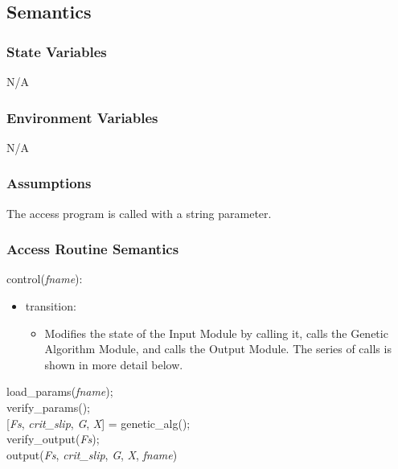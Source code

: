 \documentclass[12pt, titlepage]{article}
\begin{document}
\subsection{Semantics}

\subsubsection{State Variables}

N/A

\subsubsection{Environment Variables}

N/A

\subsubsection{Assumptions}

The access program is called with a string parameter.

\subsubsection{Access Routine Semantics}

control(\textit{fname}):
\begin{itemize}
	\item transition: 
	\begin{itemize}
		\item[] Modifies the state of the Input Module by calling it, calls the 
		Genetic Algorithm Module, and calls the Output Module. The series of 
		calls is shown in more detail below.
	\end{itemize}
\end{itemize}

load\_params(\textit{fname});\\

verify\_params();\\

[\textit{Fs}, \textit{crit\_slip}, \textit{G}, \textit{X}] = genetic\_alg();\\

verify\_output(\textit{Fs});\\

output(\textit{Fs}, \textit{crit\_slip}, \textit{G}, \textit{X}, 
\textit{fname})\\

\end{document}
